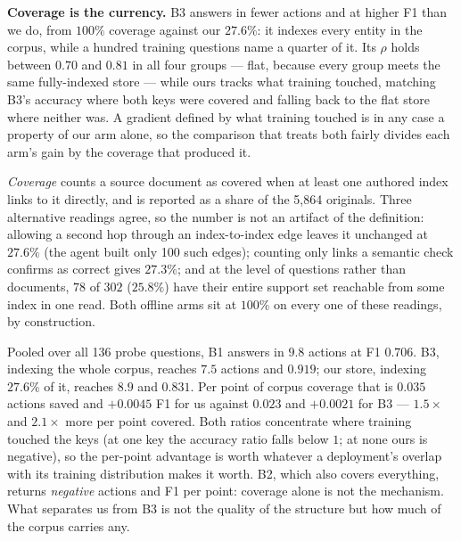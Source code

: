 \documentclass[conference]{IEEEtran}
\begin{document}
\textbf{Coverage is the currency.}\label{sec:res-perlink}
B3 answers in fewer actions and at higher F1 than we do, from $100\%$
coverage against our $27.6\%$: it indexes every entity in the corpus, while
a hundred training questions name a quarter of it. Its $\rho$ holds
between $0.70$ and $0.81$ in all four groups --- flat, because every group
meets the same fully-indexed store --- while ours tracks what training
touched, matching B3's accuracy where both keys were covered and falling
back to the flat store where neither was. A gradient defined by what training touched is in
any case a property of our arm alone, so the comparison that treats both
fairly divides each arm's gain by the coverage that produced it.

\emph{Coverage} counts a source document as covered when at least one
authored index links to it directly, and is reported as a share of the
5{,}864 originals. Three alternative readings agree, so the number is not an
artifact of the definition: allowing a second hop through an index-to-index
edge leaves it unchanged at $27.6\%$ (the agent built only 100 such edges);
counting only links a semantic check confirms as correct gives $27.3\%$; and
at the level of questions rather than documents, $78$ of $302$ ($25.8\%$)
have their entire support set reachable from some index in one read. Both
offline arms sit at $100\%$ on every one of these readings, by construction.

Pooled over all 136 probe questions, B1 answers in $9.8$ actions at F1
$0.706$. B3, indexing the whole corpus, reaches $7.5$ actions and $0.919$;
our store, indexing $27.6\%$ of it, reaches $8.9$ and $0.831$. Per point
of corpus coverage that is $0.035$ actions saved and $+0.0045$ F1 for us
against $0.023$ and $+0.0021$ for B3 --- $1.5\times$ and $2.1\times$ more
per point covered. Both ratios concentrate where training touched the
keys (at one key the accuracy ratio falls below $1$; at none ours is
negative), so the per-point advantage is worth whatever a deployment's
overlap with its training distribution makes it worth. B2, which also
covers everything, returns \emph{negative} actions and F1 per point:
coverage alone is not the mechanism. What separates us from B3 is not the
quality of the structure but how much of the corpus carries any.
\end{document}
